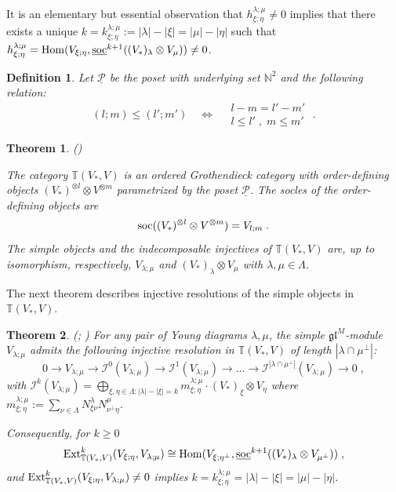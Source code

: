 \documentclass[12pt]{article}
\def\NN {{\mathbb N}}     %
\def\TT {{\mathbb T}}     %
\def\mc {\mathcal}
\def\mk {\mathfrak}
\def\tst {\Longleftrightarrow}
\def\ul  {\underline}
\newtheorem{theorem}{Theorem}[section]
\newtheorem{definition}{Definition}[section]
\begin{document}
It is an elementary but essential observation that $h^{\lambda;\mu}_{\xi;\eta}\ne 0$ implies that there exists a unique $k=k^{\lambda;\mu}_{\xi;\eta}:=|\lambda|-|\xi|=|\mu|-|\eta|$ such that $h^{\lambda;\mu}_{\xi;\eta}={\rm Hom}(V_{\xi;\eta},\ul{\rm soc}^{k+1}((V_*)_\lambda\otimes V_\mu))\ne 0$.


\begin{definition}\label{Def Poset 0 0}
Let $\ul{\mc P}$ be the poset with underlying set $\NN^{2}$ and the following relation:
$$
(l;m)\leq (l';m') \quad \tst \quad \begin{array}{|l} l - m= l' - m' \\ l\leq l' \;,\; m\leq m' \end{array}\;.
$$
\end{definition}


\begin{theorem}\label{Theo Tsmall is ord Groth} (\cite[\S~4.2]{Chirvasitu-Penkov-RC})

The category $\TT(V_*,V)$ is an ordered Grothendieck category with order-defining objects $(V_*)^{\otimes l} \otimes V^{\otimes m}$ parametrized by the poset $\ul{\mc P}$. The socles of the order-defining objects are
$$
{\rm soc}((V_*)^{\otimes l} \otimes V^{\otimes m}) = V_{l;m} \;.
$$
The simple objects and the indecomposable injectives of $\TT(V_*,V)$ are, up to isomorphism, respectively, $V_{\lambda;\mu}$ and $(V_*)_{\lambda}\otimes V_{\mu}$ with $\lambda,\mu\in\Lambda$.
\end{theorem}


The next theorem describes injective resolutions of the simple objects in $\TT(V_*,V)$.

\begin{theorem}\label{Theo smallTT Inj n Ext to Hom} (\cite{Penkov-Styrkas}; \cite{Penkov-Serganova-Mackey})
For any pair of Young diagrams $\lambda,\mu$, the simple $\mk{gl}^M$-module $V_{\lambda;\mu}$ admits the following injective resolution in $\TT(V_*,V)$ of length $|\lambda\cap\mu^{\perp}|$:
$$
0\to V_{\lambda;\mu} \to \mc I^0(V_{\lambda;\mu}) \to \mc I^1(V_{\lambda;\mu}) \to ... \to \mc I^{|\lambda\cap\mu^{\perp}|}(V_{\lambda;\mu}) \to 0 \;,
$$
with $\mc I^k(V_{\lambda;\mu}) = \bigoplus\limits_{\xi,\eta\in\Lambda:|\lambda|-|\xi|=k} m^{\lambda;\mu}_{\xi;\eta}\cdot (V_*)_{\xi}\otimes V_{\eta}$ where $m^{\lambda;\mu}_{\xi;\eta}:=\sum\limits_{\nu\in\Lambda} N^{\lambda}_{\xi\nu}N^{\mu}_{\nu^\perp\eta}$.

Consequently, for $k\geq 0$
$$
{\rm Ext}^k_{\TT(V_*,V)}(V_{\xi;\eta},V_{\lambda;\mu})\cong {\rm Hom}(V_{\xi;\eta^\perp},\ul{\rm soc}^{k+1}((V_*)_{\lambda} \otimes V_{\mu^\perp}))\;,
$$
and ${\rm Ext}^k_{\TT(V_*,V)}(V_{\xi;\eta},V_{\lambda;\mu})\ne 0$ implies $k=k^{\lambda;\mu}_{\xi;\eta}=|\lambda|-|\xi|=|\mu|-|\eta|$.
\end{theorem}
\end{document}
